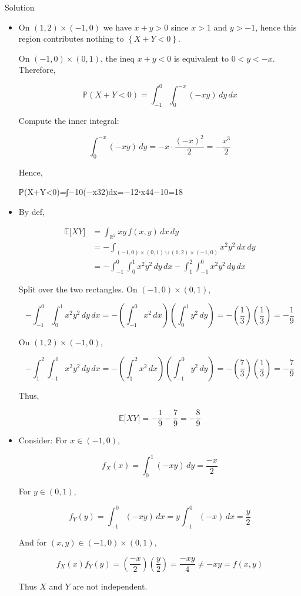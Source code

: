 \documentclass{qlnotes-export}
\begin{document}
\begin{qlsolution}{Solution}

\begin{itemize}
\item
  On \((1,2) \times ( - 1,0)\) we have \(x + y > 0\) since \(x > 1\) and \(y > - 1\), hence this region contributes nothing to \(\left\{ {X + Y < 0} \right\}\).

  On \(( - 1,0) \times (0,1)\), the ineq \(x + y < 0\) is equivalent to \(0 < y < - x\). Therefore,

  \[{\mathbb{P}}(X + Y < 0) = \int_{- 1}^{0}\int_{0}^{- x}( - xy)\, dy\, dx\]

  Compute the inner integral:

  \[\int_{0}^{- x}( - xy)\, dy = - x \cdot \frac{( - x)^{2}}{2} = - \frac{x^{3}}{2}\]

  Hence,

  {ℙ(X+Y\textless0)=∫−10(−x32)dx=−12⋅x44−10=18}
\item
  By def,

  \[\begin{matrix}
  {{\mathbb{E}}\lbrack XY\rbrack} & {= \int_{{\mathbb{R}}^{2}}xy\, f(x,y)\, dx\, dy} \\
   & {= - \int_{( - 1,0) \times (0,1) \cup (1,2) \times ( - 1,0)}x^{2}y^{2}\, dx\, dy} \\
   & {= - \int_{- 1}^{0}\int_{0}^{1}x^{2}y^{2}\, dy\, dx - \int_{1}^{2}\int_{- 1}^{0}x^{2}y^{2}\, dy\, dx}
  \end{matrix}\]

  Split over the two rectangles. On \(( - 1,0) \times (0,1)\),

  \[- \int_{- 1}^{0}\int_{0}^{1}x^{2}y^{2}\, dy\, dx = - \left( {\int_{- 1}^{0}x^{2}\, dx} \right)\left( {\int_{0}^{1}y^{2}\, dy} \right) = - \left( \frac{1}{3} \right)\left( \frac{1}{3} \right) = - \frac{1}{9}\]

  On \((1,2) \times ( - 1,0)\),

  \[- \int_{1}^{2}\int_{- 1}^{0}x^{2}y^{2}\, dy\, dx = - \left( {\int_{1}^{2}x^{2}\, dx} \right)\left( {\int_{- 1}^{0}y^{2}\, dy} \right) = - \left( \frac{7}{3} \right)\left( \frac{1}{3} \right) = - \frac{7}{9}\]

  Thus,

  \[{\mathbb{E}}\lbrack XY\rbrack = - \frac{1}{9} - \frac{7}{9} = - \frac{8}{9}\]
\item
  Consider: For \(x \in ( - 1,0)\),

  \[f_{X}(x) = \int_{0}^{1}( - xy)\, dy = \frac{- x}{2}\]

  For \(y \in (0,1)\),

  \[f_{Y}(y) = \int_{- 1}^{0}( - xy)\, dx = y\int_{- 1}^{0}( - x)\, dx = \frac{y}{2}\]

  And for \((x,y) \in ( - 1,0) \times (0,1)\),

  \[f_{X}(x)f_{Y}(y) = \left( \frac{- x}{2} \right)\left( \frac{y}{2} \right) = \frac{- xy}{4} \neq - xy = f(x,y)\]

  Thus \(X\) and \(Y\) are not independent.
\end{itemize}

\end{qlsolution}
\end{document}

